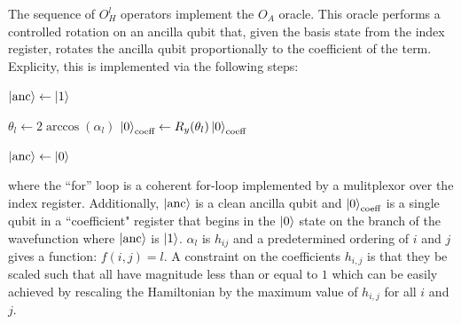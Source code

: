 The sequence of $O_H^l$ operators implement the $O_A$ oracle.
This oracle performs a controlled rotation on an ancilla qubit that, given the basis state from the index register, rotates the ancilla qubit proportionally to the coefficient of the term.
Explicity, this is implemented via the following steps:
\begin{algorithmic}[1]
            \State $\ket{\text{anc}} \gets \ket{1}$
        \EndIf

            \State $\theta_l \gets 2\arccos(\alpha_l)$
            \State $\ket{0}_{\text{coeff}} \gets R_y(\theta_l) \ket{0}_{\text{coeff}}$ 
        \EndIf

        \State $\ket{\text{anc}} \gets \ket{0}$
    \EndFor
\end{algorithmic}
where the ``for'' loop is a coherent for-loop implemented by a mulitplexor over the index register.
Additionally, $\ket{\text{anc}}$ is a clean ancilla qubit and $\ket{0}_{\text{coeff}}$ is a single qubit in a ``coefficient" register that begins in the $\ket{0}$ state on the branch of the wavefunction where $\ket{\text{anc}}$ is $\ket{1}$. 
$\alpha_l$ is $h_{ij}$ and a predetermined ordering of $i$ and $j$ gives a function: $f(i, j) = l$.
A constraint on the coefficients $h_{i, j}$ is that they be scaled such that all have magnitude less than or equal to $1$ which can be easily achieved by rescaling the Hamiltonian by the maximum value of $h_{i, j}$ for all $i$ and $j$.


